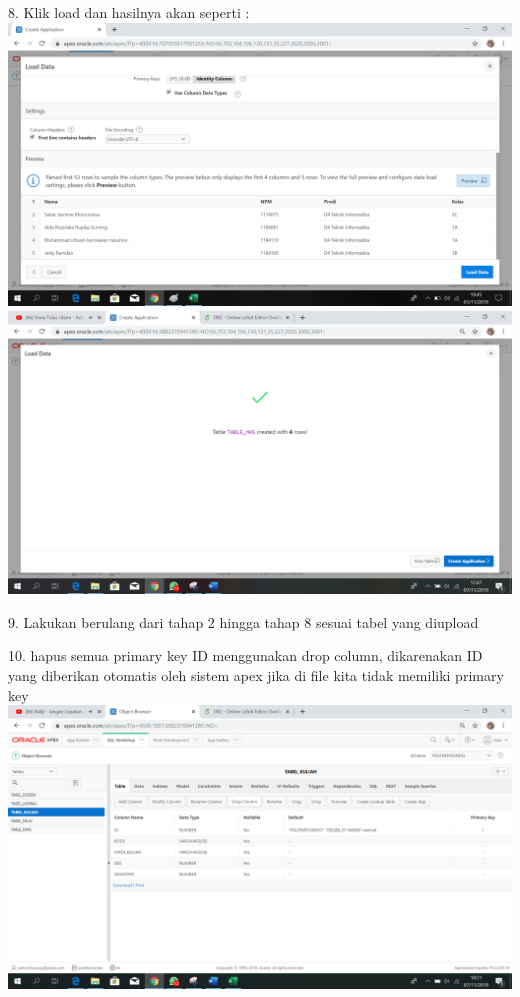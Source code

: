 \documentclass{article}
\begin{document}
\item 8. Klik load dan hasilnya akan seperti :\\
\includegraphics[width=15cm\textwidth]{figure/6load.png}
\includegraphics[width=15cm\textwidth]{figure/hasil.png}

\item 9. Lakukan berulang dari tahap 2 hingga tahap 8 sesuai tabel yang diupload\\

\item 10. hapus semua primary key ID menggunakan drop column, dikarenakan ID yang diberikan otomatis oleh sistem apex jika di ﬁle kita tidak memiliki primary key\\
\includegraphics[width=15cm\textwidth]{figure/dropclom.png}
\end{document}
